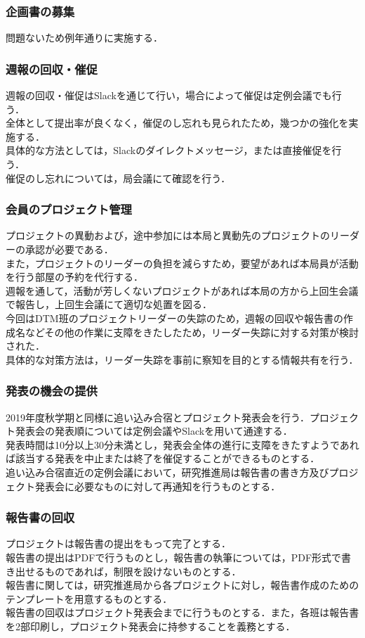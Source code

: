 \subsubsection*{企画書の募集}問題ないため例年通りに実施する．\\\subsubsection*{週報の回収・催促}週報の回収・催促はSlackを通じて行い，場合によって催促は定例会議でも行う．\\全体として提出率が良くなく，催促のし忘れも見られたため，幾つかの強化を実施する．\\具体的な方法としては，Slackのダイレクトメッセージ，または直接催促を行う．\\催促のし忘れについては，局会議にて確認を行う．\\\subsubsection*{会員のプロジェクト管理}プロジェクトの異動および，途中参加には本局と異動先のプロジェクトのリーダーの承認が必要である．\\また，プロジェクトのリーダーの負担を減らすため，要望があれば本局員が活動を行う部屋の予約を代行する．\\週報を通して，活動が芳しくないプロジェクトがあれば本局の方から上回生会議で報告し，上回生会議にて適切な処置を図る．\\今回はDTM班のプロジェクトリーダーの失踪のため，週報の回収や報告書の作成名などその他の作業に支障をきたしたため，リーダー失踪に対する対策が検討された．\\具体的な対策方法は，リーダー失踪を事前に察知を目的とする情報共有を行う．\\\subsubsection*{発表の機会の提供}2019年度秋学期と同様に追い込み合宿とプロジェクト発表会を行う．プロジェクト発表会の発表順については定例会議やSlackを用いて通達する．\\発表時間は10分以上30分未満とし，発表会全体の進行に支障をきたすようであれば該当する発表を中止または終了を催促することができるものとする．\\追い込み合宿直近の定例会議において，研究推進局は報告書の書き方及びプロジェクト発表会に必要なものに対して再通知を行うものとする．\subsubsection*{報告書の回収}プロジェクトは報告書の提出をもって完了とする．\\報告書の提出はPDFで行うものとし，報告書の執筆については，PDF形式で書き出せるものであれば，制限を設けないものとする．\\報告書に関しては，研究推進局から各プロジェクトに対し，報告書作成のためのテンプレートを用意するものとする．\\報告書の回収はプロジェクト発表会までに行うものとする．また，各班は報告書を2部印刷し，プロジェクト発表会に持参することを義務とする．\\

